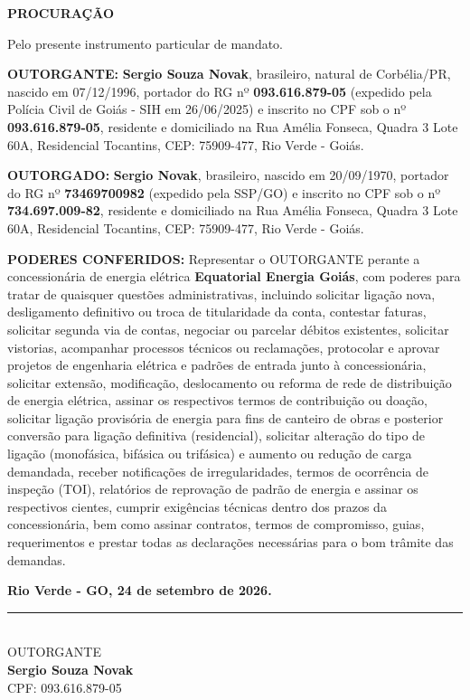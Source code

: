 \documentclass[12pt,a4paper]{article}
\begin{document}
\sloppy

\begin{center}
    {\huge \textbf{PROCURAÇÃO}}
\end{center}

\vspace{0.4cm}

Pelo presente instrumento particular de mandato.

\vspace{0.4cm}

\textbf{OUTORGANTE:} \textbf{Sergio Souza Novak}, brasileiro, natural de Corbélia/PR, nascido em 07/12/1996, portador do RG nº \textbf{093.616.879-05} (expedido pela Polícia Civil de Goiás - SIH em 26/06/2025) e inscrito no CPF sob o nº \textbf{093.616.879-05}, residente e domiciliado na Rua Amélia Fonseca, Quadra 3 Lote 60A, Residencial Tocantins, CEP: 75909-477, Rio Verde - Goiás.

\vspace{0.3cm}

\textbf{OUTORGADO:} \textbf{Sergio Novak}, brasileiro, nascido em 20/09/1970, portador do RG nº \textbf{73469700982} (expedido pela SSP/GO) e inscrito no CPF sob o nº \textbf{734.697.009-82}, residente e domiciliado na Rua Amélia Fonseca, Quadra 3 Lote 60A, Residencial Tocantins, CEP: 75909-477, Rio Verde - Goiás.

\vspace{0.3cm}

\textbf{PODERES CONFERIDOS:} Representar o OUTORGANTE perante a concessionária de energia elétrica \textbf{Equatorial Energia Goiás}, com poderes para tratar de quaisquer questões administrativas, incluindo solicitar ligação nova, desligamento definitivo ou troca de titularidade da conta, contestar faturas, solicitar segunda via de contas, negociar ou parcelar débitos existentes, solicitar vistorias, acompanhar processos técnicos ou reclamações, protocolar e aprovar projetos de engenharia elétrica e padrões de entrada junto à concessionária, solicitar extensão, modificação, deslocamento ou reforma de rede de distribuição de energia elétrica, assinar os respectivos termos de contribuição ou doação, solicitar ligação provisória de energia para fins de canteiro de obras e posterior conversão para ligação definitiva (residencial), solicitar alteração do tipo de ligação (monofásica, bifásica ou trifásica) e aumento ou redução de carga demandada, receber notificações de irregularidades, termos de ocorrência de inspeção (TOI), relatórios de reprovação de padrão de energia e assinar os respectivos cientes, cumprir exigências técnicas dentro dos prazos da concessionária, bem como assinar contratos, termos de compromisso, guias, requerimentos e prestar todas as declarações necessárias para o bom trâmite das demandas.

\vspace{1cm}

\noindent \textbf{Rio Verde - GO, 24 de setembro de 2026.}

\vspace{3cm}

\begin{center}
    \rule{0.65\textwidth}{0.4pt} \\[0.2cm]
    OUTORGANTE \\[0.2cm]
    \textbf{Sergio Souza Novak} \\
    CPF: 093.616.879-05
\end{center}
\end{document}
